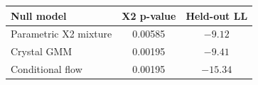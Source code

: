 \documentclass{article}
\begin{document}
\begin{center}
  \centering
  \scriptsize
  \setlength{\tabcolsep}{4pt}
  \label{tab:null-appendix}
  \begin{tabular}{lcc}
    \toprule
    Null model & X2 p-value & Held-out LL \\
    \midrule
    Parametric X2 mixture & 0.00585 & \(-9.12\) \\
    Crystal GMM & 0.00195 & \(-9.41\) \\
    Conditional flow & 0.00195 & \(-15.34\) \\
    \bottomrule
  \end{tabular}
\end{center}
\end{document}
